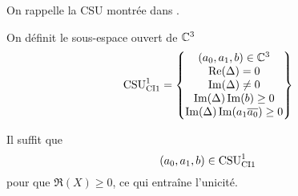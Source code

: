     On rappelle la CSU montrée dans \cite{stupfel_sufficient_2011}.

    \begin{defn}
      \label{def:csu:ci1-1}

      On définit le sous-espace ouvert de \(\CC^3\)
      \begin{equation*}
        \CSU[1]{CI1} = \left\lbrace 
        \begin{matrix}
        (a_0,a_1,b) \in \CC^3
        \\
        \Re(\Delta) = 0
        \\
        \Im(\Delta) \not = 0
        \\
        \Im(\Delta)\Im(b) \ge 0
        \\
        \Im(\Delta )\Im(a_1\conj{a_0})\ge 0
        \end{matrix}
        \right\rbrace
      \end{equation*}
    \end{defn}

    \begin{prop}
      \label{prop:csu:ci1-1}
      Il suffit que
      \begin{equation*}
        (a_0,a_1,b) \in \CSU[1]{CI1}
      \end{equation*}
      pour que \(\Re(X)\ge 0\), ce qui entraîne l'unicité.
    \end{prop}

